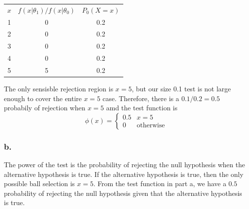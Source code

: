 \documentclass{article}
\begin{document}
\begin{tabular}{ c c c }
$x$ & $f(x|\theta_1)/f(x|\theta_0)$ & $P_0(X=x)$ \\
1 & 0 & 0.2 \\
2 & 0 & 0.2 \\
3 & 0 & 0.2 \\
4 & 0 & 0.2 \\
5 & 5 & 0.2
\end{tabular}

The only sensisble rejection region is $x = 5$, but our size 0.1 test is not large enough to cover the entire $x = 5$ case. Therefore, there is a $0.1/0.2 = 0.5$ probabily of rejection when $x = 5$ amd the test function is 
\[\phi(x)=\begin{cases} 0.5 & x = 5 \\ 0 & \text{otherwise}\end{cases}\]
\subsubsection*{b.}
The power of the test is the probability of rejecting the null hypothesis when the alternative hypothesis is true. If the alternative hypothesis is true, then the only possible ball selection is $x=5$. From the test function in part a, we have a $0.5$ probability of rejecting the null hypothesis given that the alternative hypothesis is true. 
\end{document}
